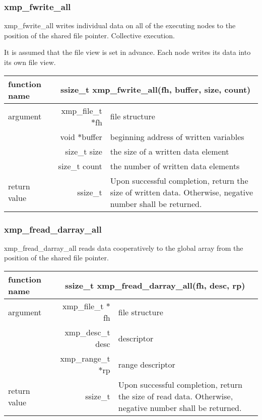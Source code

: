    \subsubsection{xmp\_fwrite\_all}
   xmp\_fwrite\_all writes individual data on all of the executing nodes
   to the position of the shared file pointer. Collective execution.

   It is assumed that the file view is set in advance. Each node writes
   its data into its own file view.

   \begin{table}[h]
    \begin{center}
     \begin{tabular}{|l|r|p{80mm}|}
      \hline
      {\bf function name}  & \multicolumn{2}{c|}{\bf ssize\_t
      xmp\_fwrite\_all(fh, buffer, size, count)}  \\ \hline \hline
      argument & xmp\_file\_t $*$fh & file structure \\ \cline{2-3}
      & void $*$buffer & beginning address of written variables \\ \cline{2-3}
      & size\_t size & the size of a written data element \\ \cline{2-3}
      & size\_t count & the number of written data elements \\ \hline
      return value & ssize\_t & Upon successful completion, return the size
      of written data. Otherwise, negative number shall be
      returned. \\ \hline
      \end{tabular}
     \end{center}
    \label{tb:aaa}
   \end{table}

   \subsubsection{xmp\_fread\_darray\_all}
   xmp\_fread\_darray\_all reads data cooperatively to the global array from the position of the shared file pointer.

   \begin{table}[h]
    \begin{center}
     \begin{tabular}{|l|r|p{80mm}|}
      \hline
      {\bf function name}  & \multicolumn{2}{c|}{\bf ssize\_t
      xmp\_fread\_darray\_all(fh, desc, rp)} \\ \hline \hline
      argument & xmp\_file\_t $*$fh & file structure \\ \cline{2-3}
      & xmp\_desc\_t desc & descriptor \\ \cline{2-3}
      & xmp\_range\_t $*$rp & range descriptor \\ \hline
      return value & ssize\_t & Upon successful completion, return the size
	      of read data. Otherwise, negative number shall be
	      returned. \\ \hline
      \end{tabular}
     \end{center}
    \label{tb:aaa}
   \end{table}


